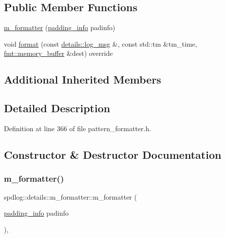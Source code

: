 \subsection*{Public Member Functions}
\begin{DoxyCompactItemize}
\item 
\hyperlink{classspdlog_1_1details_1_1m__formatter_a218eb07d23a3b69557b9347eae493dc3}{m\+\_\+formatter} (\hyperlink{structspdlog_1_1details_1_1padding__info}{padding\+\_\+info} padinfo)
\item 
void \hyperlink{classspdlog_1_1details_1_1m__formatter_a507ce5bc00de736d28d93e5d7307589b}{format} (const \hyperlink{structspdlog_1_1details_1_1log__msg}{details\+::log\+\_\+msg} \&, const std\+::tm \&tm\+\_\+time, \hyperlink{format_8h_a21cbf729f69302f578e6db21c5e9e0d2}{fmt\+::memory\+\_\+buffer} \&dest) override
\end{DoxyCompactItemize}
\subsection*{Additional Inherited Members}


\subsection{Detailed Description}


Definition at line 366 of file pattern\+\_\+formatter.\+h.



\subsection{Constructor \& Destructor Documentation}
\mbox{\label{classspdlog_1_1details_1_1m__formatter_a218eb07d23a3b69557b9347eae493dc3}} 
\subsubsection{\texorpdfstring{m\+\_\+formatter()}{m\_formatter()}}
{\footnotesize\ttfamily spdlog\+::details\+::m\+\_\+formatter\+::m\+\_\+formatter (\begin{DoxyParamCaption}\item[{\hyperlink{structspdlog_1_1details_1_1padding__info}{padding\+\_\+info}}]{padinfo }\end{DoxyParamCaption})\hspace{0.3cm}{\ttfamily [inline]}, {\ttfamily [explicit]}}



